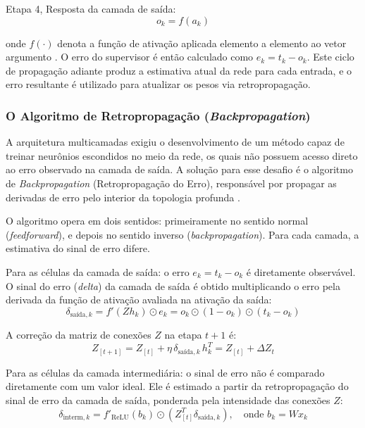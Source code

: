 Etapa 4, Resposta da camada de saída:
\begin{equation}
o_k = f(a_k)
\end{equation}

onde $f(\cdot)$ denota a função de ativação aplicada elemento a elemento ao vetor argumento \cite{abdi1994}. O erro do supervisor é então calculado como $e_k = t_k - o_k$. Este ciclo de propagação adiante produz a estimativa atual da rede para cada entrada, e o erro resultante é utilizado para atualizar os pesos via retropropagação.

\subsubsection{O Algoritmo de Retropropagação (\textit{Backpropagation})}

A arquitetura multicamadas exigiu o desenvolvimento de um método capaz de treinar neurônios escondidos no meio da rede, os quais não possuem acesso direto ao erro observado na camada de saída. A solução para esse desafio é o algoritmo de \textit{Backpropagation} (Retropropagação do Erro), responsável por propagar as derivadas de erro pelo interior da topologia profunda \cite{silva2016}.

O algoritmo opera em dois sentidos: primeiramente no sentido normal (\textit{feedforward}), e depois no sentido inverso (\textit{backpropagation}). Para cada camada, a estimativa do sinal de erro difere.

Para as células da camada de saída: o erro $e_k = t_k - o_k$ é diretamente observável. O sinal do erro (\textit{delta}) da camada de saída é obtido multiplicando o erro pela derivada da função de ativação avaliada na ativação da saída:
\begin{equation}
\delta_{\text{saída},k} = f'(Zh_k) \odot e_k = o_k \odot (1 - o_k) \odot (t_k - o_k)
\end{equation}

A correção da matriz de conexões $Z$ na etapa $t+1$ é:
\begin{equation}
Z_{[t+1]} = Z_{[t]} + \eta \, \delta_{\text{saída},k} \, h_k^T = Z_{[t]} + \Delta Z_t
\end{equation}

Para as células da camada intermediária: o sinal de erro não é comparado diretamente com um valor ideal. Ele é estimado a partir da retropropagação do sinal de erro da camada de saída, ponderada pela intensidade das conexões $Z$:
\begin{equation}
\delta_{\text{interm},k} = f'_{\text{ReLU}}(b_k) \odot \left(Z_{[t]}^T \delta_{\text{saída},k}\right), \quad \text{onde } b_k = Wx_k
\end{equation}

